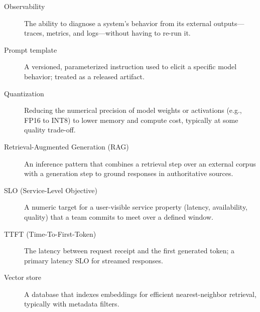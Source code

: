\begin{description}
  \item[Observability]
        The ability to diagnose a system's behavior from
        its external outputs---traces, metrics, and logs---without
        having to re-run it.

  \item[Prompt template]
        A versioned, parameterized instruction used to
        elicit a specific model behavior; treated as a released
        artifact.

  \item[Quantization]
        Reducing the numerical precision of model weights
        or activations (e.g., FP16 to INT8) to lower memory and
        compute cost, typically at some quality trade-off.

  \item[Retrieval-Augmented Generation (RAG)]
        An inference pattern that combines a retrieval
        step over an external corpus with a generation step to ground
        responses in authoritative sources.

  \item[SLO (Service-Level Objective)]
        A numeric target for a user-visible service
        property (latency, availability, quality) that a team commits
        to meet over a defined window.

  \item[TTFT (Time-To-First-Token)]
        The latency between request receipt and the first
        generated token; a primary latency SLO for streamed responses.

  \item[Vector store]
        A database that indexes embeddings for efficient
        nearest-neighbor retrieval, typically with metadata filters.

\end{description}

